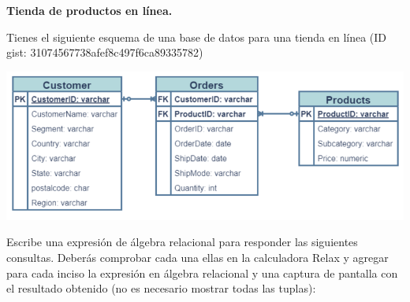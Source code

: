 \begin{center}
    \textbf{\textbf{Tienda de productos en línea.}}

    Tienes el siguiente esquema de una base de datos para una tienda en línea (ID gist: 31074567738afef8c497f6ca89335782)

    \includegraphics[height=5cm]{resources/2.png}

    Escribe una expresión de álgebra relacional para responder las siguientes consultas. Deberás comprobar cada una ellas
en la calculadora Relax y agregar para cada inciso la expresión en álgebra relacional y una captura de pantalla con el
resultado obtenido (no es necesario mostrar todas las tuplas):
\end{center}
\newpage
